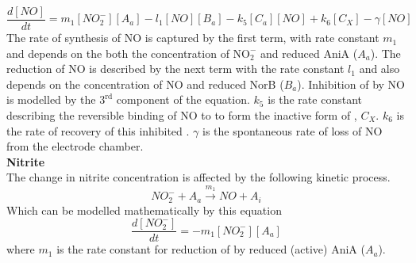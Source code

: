\begin{equation}
\frac{d[NO]}{dt} = m_{1}[NO_2^-][A_a] - l_1[NO][B_a] - k_5[C_a][NO] + k_6 [C_X] - \gamma[NO]
\label{eq:no}
\end{equation}
The rate of synthesis of NO is captured by the first term, with rate constant $m_{1}$ and depends on the both the concentration of $\mathrm{NO}_\mathrm{2}^\mathrm{-}$ and reduced AniA ($A_a$). The reduction of NO is described by the next term with the rate constant $l_1$ and also depends on the concentration of NO and reduced NorB ($B_a$). Inhibition of \cbbthree{} by NO is modelled by the $\mathrm{3}^\mathrm{rd}$ component of the equation. $k_5$ is the rate constant describing the reversible binding of NO to \cbbthree{} to form the inactive form of \cbbthree{}, $C_X$. $k_6$ is the rate of recovery of this inhibited \cbbthree{}. $\gamma$ is the spontaneous rate of loss of NO from the electrode chamber.\\
{\bf Nitrite}\\
The change in nitrite concentration is affected by the following kinetic process.
\begin{equation*}
NO_2^- + A_a \xrightarrow{m_1} NO + A_i
\end{equation*}
Which can be modelled mathematically by this equation
\begin{equation}
\frac{d[NO_2^-]}{dt} = - m_{1}[NO_2^-][A_a]
\label{eq:nitrite}
\end{equation}
where $m_{1}$ is the rate constant for reduction of \cNitrite{} by reduced (active) AniA ($A_a$).

